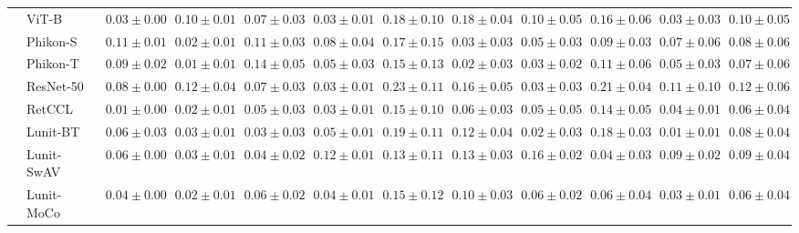 \begin{tabular}{ll|cccc|c|cccc|c}
 & ViT-B~\cite{kolesnikov2021image} & $0.03 \pm 0.00$ & $0.10 \pm 0.01$ & $0.07 \pm 0.03$ & $0.03 \pm 0.01$ & $0.18 \pm 0.10$ & $0.18 \pm 0.04$ & $0.10 \pm 0.05$ & $0.16 \pm 0.06$ & $0.03 \pm 0.03$ & $0.10 \pm 0.05$ \\
 & Phikon-S~\cite{filiot2023scaling} & $0.11 \pm 0.01$ & $0.02 \pm 0.01$ & $0.11 \pm 0.03$ & $0.08 \pm 0.04$ & $0.17 \pm 0.15$ & $0.03 \pm 0.03$ & $0.05 \pm 0.03$ & $0.09 \pm 0.03$ & $0.07 \pm 0.06$ & $0.08 \pm 0.06$ \\
 & Phikon-T~\cite{filiot2023scaling} & $0.09 \pm 0.02$ & $\mathbf{0.01 \pm 0.01}$ & $0.14 \pm 0.05$ & $0.05 \pm 0.03$ & $0.15 \pm 0.13$ & $\mathbf{0.02 \pm 0.03}$ & $0.03 \pm 0.02$ & $0.11 \pm 0.06$ & $0.05 \pm 0.03$ & $0.07 \pm 0.06$ \\
 & ResNet-50~\cite{he2015deep} & $0.08 \pm 0.00$ & $0.12 \pm 0.04$ & $0.07 \pm 0.03$ & $0.03 \pm 0.01$ & $0.23 \pm 0.11$ & $0.16 \pm 0.05$ & $0.03 \pm 0.03$ & $0.21 \pm 0.04$ & $0.11 \pm 0.10$ & $0.12 \pm 0.06$ \\
 & RetCCL~\cite{wang2023retccl} & $0.01 \pm 0.00$ & $0.02 \pm 0.01$ & $0.05 \pm 0.03$ & $0.03 \pm 0.01$ & $0.15 \pm 0.10$ & $0.06 \pm 0.03$ & $0.05 \pm 0.05$ & $0.14 \pm 0.05$ & $0.04 \pm 0.01$ & $0.06 \pm 0.04$ \\
 & Lunit-BT~\cite{kang2023benchmarking} & $0.06 \pm 0.03$ & $0.03 \pm 0.01$ & $0.03 \pm 0.03$ & $0.05 \pm 0.01$ & $0.19 \pm 0.11$ & $0.12 \pm 0.04$ & $0.02 \pm 0.03$ & $0.18 \pm 0.03$ & $\mathbf{0.01 \pm 0.01}$ & $0.08 \pm 0.04$ \\
 & Lunit-SwAV~\cite{kang2023benchmarking} & $0.06 \pm 0.00$ & $0.03 \pm 0.01$ & $0.04 \pm 0.02$ & $0.12 \pm 0.01$ & $0.13 \pm 0.11$ & $0.13 \pm 0.03$ & $0.16 \pm 0.02$ & $0.04 \pm 0.03$ & $0.09 \pm 0.02$ & $0.09 \pm 0.04$ \\
 & Lunit-MoCo~\cite{kang2023benchmarking} & $0.04 \pm 0.00$ & $0.02 \pm 0.01$ & $0.06 \pm 0.02$ & $0.04 \pm 0.01$ & $0.15 \pm 0.12$ & $0.10 \pm 0.03$ & $0.06 \pm 0.02$ & $0.06 \pm 0.04$ & $0.03 \pm 0.01$ & $0.06 \pm 0.04$ \\
\cline{1-12}
\bottomrule
\end{tabular}
